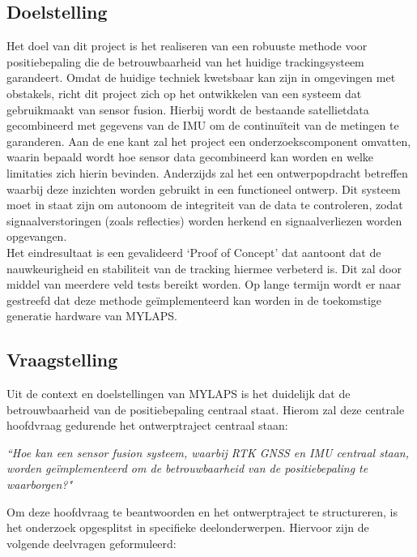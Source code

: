 \subsection{Doelstelling}
Het doel van dit project is het realiseren van een robuuste methode voor positiebepaling die de betrouwbaarheid van het huidige trackingsysteem garandeert. Omdat de huidige techniek kwetsbaar kan zijn in omgevingen met obstakels, richt dit project zich op het ontwikkelen van een systeem dat gebruikmaakt van sensor fusion. Hierbij wordt de bestaande satellietdata gecombineerd met gegevens van de IMU om de continuïteit van de metingen te garanderen. Aan de ene kant zal het project een onderzoekscomponent omvatten, waarin bepaald wordt hoe sensor data gecombineerd kan worden en welke limitaties zich hierin bevinden. Anderzijds zal het een ontwerpopdracht betreffen waarbij deze inzichten worden gebruikt in een functioneel ontwerp. Dit systeem moet in staat zijn om autonoom de integriteit van de data te controleren, zodat signaalverstoringen (zoals reflecties) worden herkend en signaalverliezen worden opgevangen. \\

Het eindresultaat is een gevalideerd `Proof of Concept' dat aantoont dat de nauwkeurigheid en stabiliteit van de tracking hiermee verbeterd is. Dit zal door middel van meerdere veld tests bereikt worden. Op lange termijn wordt er naar gestreefd dat deze methode geïmplementeerd kan worden in de toekomstige generatie hardware van MYLAPS.


\subsection{Vraagstelling}
Uit de context en doelstellingen van MYLAPS is het duidelijk dat de betrouwbaarheid van de positiebepaling centraal staat. Hierom zal deze centrale hoofdvraag gedurende het ontwerptraject centraal staan: 


\begin{tcolorbox}[colback=gray!10, colframe=gray!50, title=Hoofdvraag]
\textit{``Hoe kan een sensor fusion systeem, waarbij RTK GNSS en IMU centraal staan, worden geïmplementeerd om de betrouwbaarheid van de positiebepaling te waarborgen?"}
\end{tcolorbox}

Om deze hoofdvraag te beantwoorden en het ontwerptraject te structureren, is het onderzoek opgesplitst in specifieke deelonderwerpen. Hiervoor zijn de volgende deelvragen geformuleerd:

